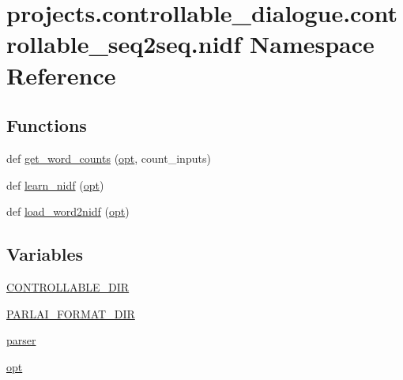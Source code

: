 \hypertarget{namespaceprojects_1_1controllable__dialogue_1_1controllable__seq2seq_1_1nidf}{}\section{projects.\+controllable\+\_\+dialogue.\+controllable\+\_\+seq2seq.\+nidf Namespace Reference}
\label{namespaceprojects_1_1controllable__dialogue_1_1controllable__seq2seq_1_1nidf}
\subsection*{Functions}
\begin{DoxyCompactItemize}
\item 
def \hyperlink{namespaceprojects_1_1controllable__dialogue_1_1controllable__seq2seq_1_1nidf_ad06ddb173f03a586d8c47c0c40f2f00c}{get\+\_\+word\+\_\+counts} (\hyperlink{namespaceprojects_1_1controllable__dialogue_1_1controllable__seq2seq_1_1nidf_aef7111d92971802c719300bfe5d9f626}{opt}, count\+\_\+inputs)
\item 
def \hyperlink{namespaceprojects_1_1controllable__dialogue_1_1controllable__seq2seq_1_1nidf_afcd3d0cbb49648e760e9875d32f53f19}{learn\+\_\+nidf} (\hyperlink{namespaceprojects_1_1controllable__dialogue_1_1controllable__seq2seq_1_1nidf_aef7111d92971802c719300bfe5d9f626}{opt})
\item 
def \hyperlink{namespaceprojects_1_1controllable__dialogue_1_1controllable__seq2seq_1_1nidf_a2f882ed55572a6f2f7558732a6a692ee}{load\+\_\+word2nidf} (\hyperlink{namespaceprojects_1_1controllable__dialogue_1_1controllable__seq2seq_1_1nidf_aef7111d92971802c719300bfe5d9f626}{opt})
\end{DoxyCompactItemize}
\subsection*{Variables}
\begin{DoxyCompactItemize}
\item 
\hyperlink{namespaceprojects_1_1controllable__dialogue_1_1controllable__seq2seq_1_1nidf_acaa9979b89ad4a7ffdea00b513950e33}{C\+O\+N\+T\+R\+O\+L\+L\+A\+B\+L\+E\+\_\+\+D\+IR}
\item 
\hyperlink{namespaceprojects_1_1controllable__dialogue_1_1controllable__seq2seq_1_1nidf_a7953354070ca4e518c92d267e1147f1c}{P\+A\+R\+L\+A\+I\+\_\+\+F\+O\+R\+M\+A\+T\+\_\+\+D\+IR}
\item 
\hyperlink{namespaceprojects_1_1controllable__dialogue_1_1controllable__seq2seq_1_1nidf_a4422dfd9be2af0e9f9481a2a5c33af92}{parser}
\item 
\hyperlink{namespaceprojects_1_1controllable__dialogue_1_1controllable__seq2seq_1_1nidf_aef7111d92971802c719300bfe5d9f626}{opt}
\end{DoxyCompactItemize}


